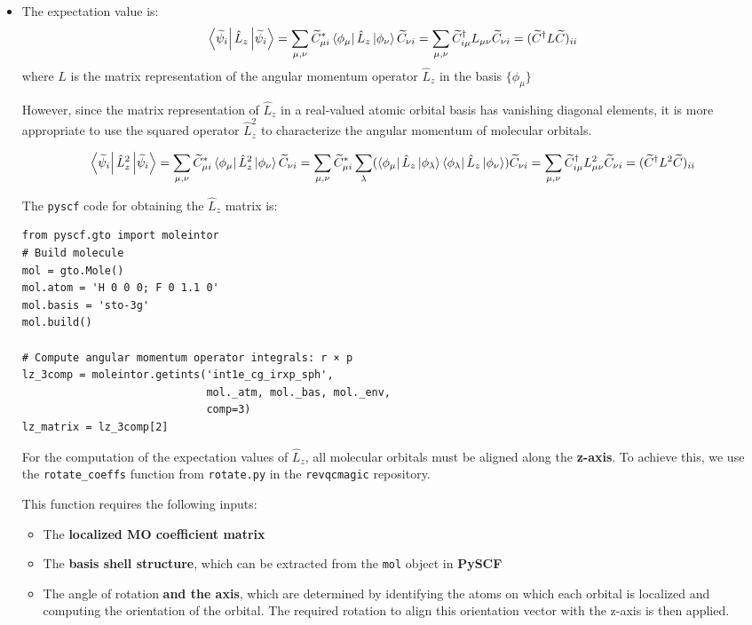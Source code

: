 \documentclass{article}
\begin{document}
\begin{itemize}
    \item The expectation value is:
    \[
    \bra{\widetilde{\psi}_i} {\hat{L}_z}\ket{\widetilde{\psi}_i} = \sum_{\mu,\nu} \widetilde{C}_{\mu i}^{*} \bra{\phi_\mu} \hat{L}_z \ket{\phi_\nu} \widetilde{C}_{\nu i} = \sum_{\mu,\nu} \widetilde{C}_{i \mu}^{\dagger} L_{\mu \nu} \widetilde{C}_{\nu i} = (\widetilde{C}^{\dagger} L \widetilde{C})_{ii}
    \]
    where \( L \) is the matrix representation of the angular momentum operator \(\hat{L}_z\) in the basis \( \{ \phi_\mu \} \) 

    However, since the matrix representation of $\hat{L}_z$ in a real-valued atomic orbital basis has vanishing diagonal elements, it is more appropriate to use the squared operator $\hat{L}_z^2$ to characterize the angular momentum of molecular orbitals.

    \[
    \bra{\widetilde{\psi}_i} {\hat{L}_z^{2}}\ket{\widetilde{\psi}_i} = \sum_{\mu,\nu} \widetilde{C}_{\mu i}^{*} \bra{\phi_\mu} \hat{L}_z^{2} \ket{\phi_\nu} \widetilde{C}_{\nu i} = \sum_{\mu,\nu} \widetilde{C}_{\mu i}^{*} \sum_{\lambda}( \bra{\phi_\mu} \hat{L}_z \ket{\phi_\lambda} \bra{\phi_\lambda} \hat{L}_z\ket{\phi_\nu}) \widetilde{C}_{\nu i} = \sum_{\mu,\nu} \widetilde{C}_{i \mu}^{\dagger} L_{\mu \nu}^2 \widetilde{C}_{\nu i} = (\widetilde{C}^{\dagger} L^2 \widetilde{C})_{ii}
    \]

    The \verb|pyscf| code for obtaining the $\hat{L}_z$ matrix is:

\begin{verbatim}
from pyscf.gto import moleintor
# Build molecule
mol = gto.Mole()
mol.atom = 'H 0 0 0; F 0 1.1 0'  
mol.basis = 'sto-3g'            
mol.build()

# Compute angular momentum operator integrals: r × p
lz_3comp = moleintor.getints('int1e_cg_irxp_sph',
                             mol._atm, mol._bas, mol._env,
                             comp=3)
lz_matrix = lz_3comp[2]

\end{verbatim}

For the computation of the expectation values of $\hat{L}_z$, all molecular orbitals must be aligned along the \textbf{z-axis}. To achieve this, we use the \verb|rotate_coeffs| function from \verb|rotate.py| in the \verb|revqcmagic| repository.

This function requires the following inputs:
\begin{itemize}
    \item The \textbf{localized MO coefficient matrix}
    \item The \textbf{basis shell structure}, which can be extracted from the \verb|mol| object in \textbf{PySCF}
    \item The angle of rotation \textbf{ and the axis}, which are determined by identifying the atoms on which each orbital is localized and computing the orientation of the orbital. The required rotation to align this orientation vector with the z-axis is then applied.
\end{itemize}


\end{itemize}
\end{document}
